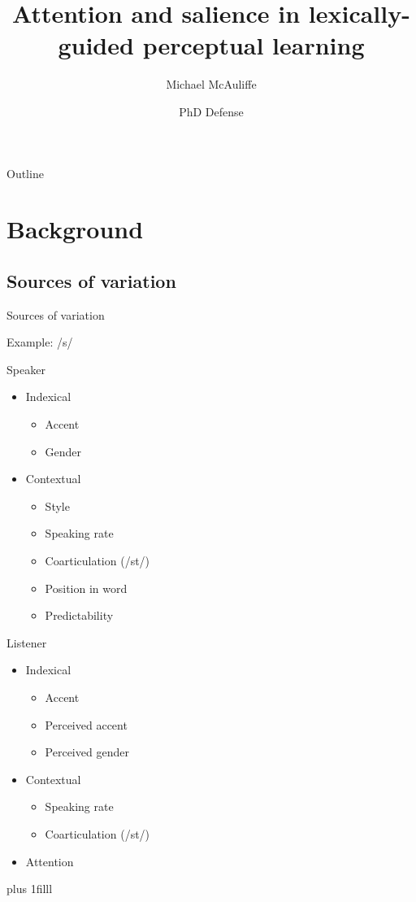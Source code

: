 \documentclass{beamer}
\title
{Attention and salience in lexically-guided perceptual learning}
\author
{Michael McAuliffe}
\institute
{}
\date
{PhD Defense}
\newcommand{\btVFill}{\vskip0pt plus 1filll}
\begin{document}
\begin{frame}
  \titlepage
\end{frame}

\begin{frame}{Outline}
\tableofcontents
\end{frame}

\section{Background}

\subsection{Sources of variation}

\begin{frame}{Sources of variation}

Example: /s/
\vfill
\begin{minipage}[t]{0.45\textwidth}
Speaker

\begin{itemize}
\item Indexical
\begin{itemize}
\item Accent
\item Gender
\end{itemize}
\item Contextual
\begin{itemize}
\item Style
\item Speaking rate
\item Coarticulation (/st\textturnr/)
\item Position in word
\item Predictability
\end{itemize}

\end{itemize}
\end{minipage}
\hfill
\begin{minipage}[t]{0.45\textwidth}
Listener

\begin{itemize}
\item Indexical
\begin{itemize}
\item Accent
\item Perceived accent
\item Perceived gender
\end{itemize}
\item Contextual
\begin{itemize}
\item Speaking rate
\item Coarticulation (/st\textturnr/)
\end{itemize}
\item Attention
\end{itemize}
\end{minipage}
\btVFill
\begin{flushright}
\scriptsize
\citet{Strand1996, Kraljic2005,Clopper2008, Pitt2012}
\end{flushright}
\end{frame}
\end{document}
